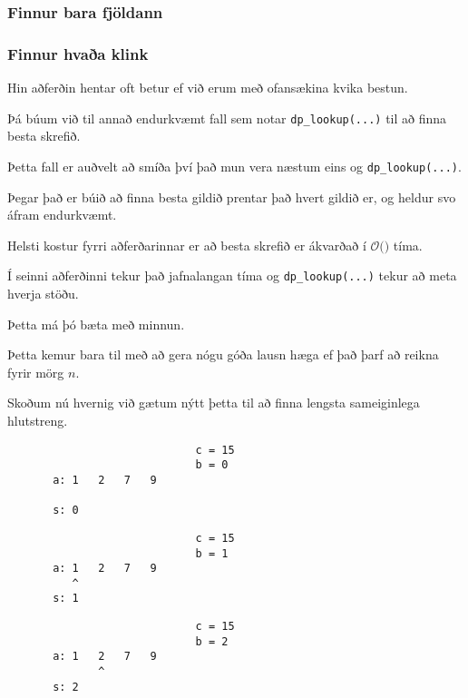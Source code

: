 {
	\frametitle{Finnur bara fjöldann}
}

{
	\frametitle{Finnur hvaða klink}
}

{
	{
		\item<1-> Hin aðferðin hentar oft betur ef við erum með ofansækina kvika bestun.
		\item<2-> Þá búum við til annað endurkvæmt fall sem notar \texttt{dp\_lookup(...)} til að finna besta skrefið.
		\item<3-> Þetta fall er auðvelt að smíða því það mun vera næstum eins og \texttt{dp\_lookup(...)}.
		\item<4-> Þegar það er búið að finna besta gildið prentar það hvert gildið er, og heldur svo áfram endurkvæmt.
	}
}

{
}

{
	{
		\item<1-> Helsti kostur fyrri aðferðarinnar er að besta skrefið er ákvarðað í $\mathcal{O}($$)$ tíma.
		\item<3-> Í seinni aðferðinni tekur það jafnalangan tíma og \texttt{dp\_lookup(...)} tekur að meta hverja stöðu.
		\item<4-> Þetta má þó bæta með minnun.
		\item<5-> Þetta kemur bara til með að gera nógu góða lausn hæga ef það þarf að reikna fyrir mörg $n$.
		\item<6-> Skoðum nú hvernig við gætum nýtt þetta til að finna lengsta sameiginlega hlutstreng.
	}
}

{
}

{ \begin{verbatim}
                             c = 15
                             b = 0
       a: 1   2   7   9

       s: 0
\end{verbatim} }

{ \begin{verbatim}
                             c = 15
                             b = 1
       a: 1   2   7   9
          ^
       s: 1
\end{verbatim} }

{ \begin{verbatim}
                             c = 15
                             b = 2
       a: 1   2   7   9
              ^
       s: 2
\end{verbatim} }

